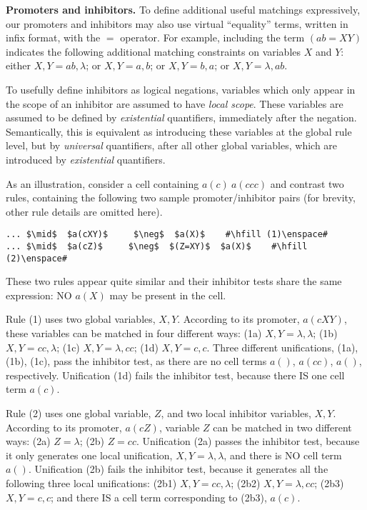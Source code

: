\smallskip
\noindent
\textbf{Promoters and inhibitors.}
To define additional useful matchings expressively, 
our promoters and inhibitors may also use virtual ``equality'' terms, 
written in infix format, with the $=$ operator.
For example, including the term $(ab = XY)$ indicates the following additional matching constraints on variables $X$ and $Y$: either $X, Y = ab, \lambda$; or $X, Y = a, b$; or $X, Y = b, a$; or $X, Y = \lambda, ab$.

To usefully define inhibitors as logical negations,
variables which only appear in the scope of an inhibitor are assumed to have \emph{local scope}. 
These variables are assumed to be defined by \emph{existential} quantifiers, immediately after the negation. 
Semantically, this is equivalent as introducing these variables at the global rule level, 
but by \emph{universal} quantifiers, after all other global variables,
which are introduced by \emph{existential} quantifiers.

As an illustration, consider a cell containing $a(c) ~ a(ccc)$ and contrast two rules, 
containing the following two sample promoter/inhibitor pairs 
(for brevity, other rule details are omitted here).

\lstset{xleftmargin=.5in, xrightmargin=.5in} 
\begin{lstlisting}
... $\mid$  $a(cXY)$     $\neg$  $a(X)$    #\hfill (1)\enspace#
... $\mid$  $a(cZ)$     $\neg$  $(Z=XY)$  $a(X)$    #\hfill (2)\enspace#
\end{lstlisting}

These two rules appear quite similar and their inhibitor tests share the same expression: 
NO $a(X)$ may be present in the cell.

Rule (1) uses two global variables, $X, Y$. 
According to its promoter, $a(cXY)$, these variables can be matched in four different ways:
(1a) $X, Y = \lambda, \lambda$; (1b) $X, Y = cc, \lambda$; (1c) $X, Y = \lambda, cc$; (1d) $X, Y = c, c$.
Three different unifications, (1a), (1b), (1c), pass the inhibitor test, 
as there are no cell terms $a()$, $a(cc)$, $a()$, respectively. 
Unification (1d) fails the inhibitor test, because there IS one cell term $a(c)$.

Rule (2) uses one global variable, $Z$, and two local inhibitor variables, $X, Y$.
According to its promoter, $a(cZ)$, variable $Z$ can be matched in two different ways: 
(2a) $Z = \lambda$; (2b) $Z = cc$.
Unification (2a) passes the inhibitor test, because it only generates one local unification,
$X, Y = \lambda, \lambda$, and there is NO cell term $a()$.
Unification (2b) fails the inhibitor test, because it generates all the following three local unifications:
(2b1) $X, Y = cc, \lambda$; (2b2) $X, Y = \lambda, cc$; (2b3) $X, Y = c, c$; 
and there IS a cell term corresponding to (2b3), $a(c)$.

